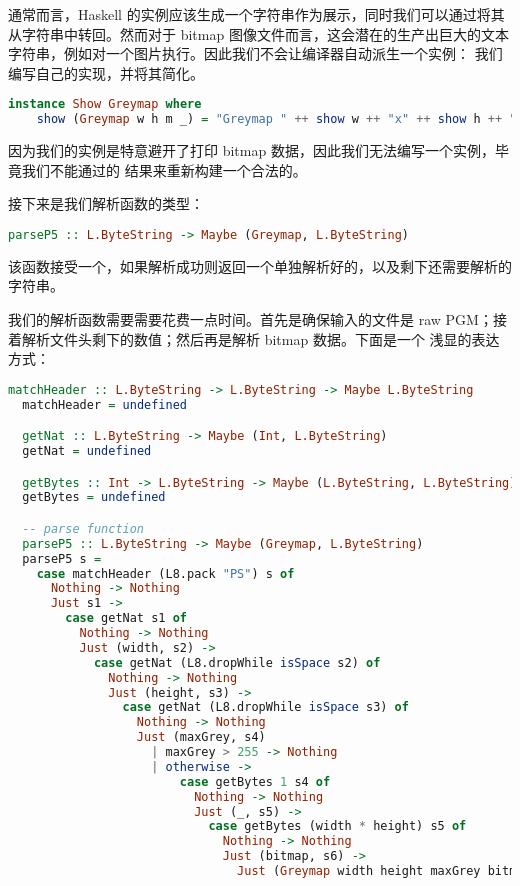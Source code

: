 \documentclass[./main.tex]{subfiles}
\begin{document}
通常而言，Haskell 的实例应该生成一个字符串作为展示，同时我们可以通过将其从字符串中转回。然而对于 bitmap
图像文件而言，这会潜在的生产出巨大的文本字符串，例如对一个图片执行。因此我们不会让编译器自动派生一个实例：
我们编写自己的实现，并将其简化。

\begin{lstlisting}[language=Haskell]
  instance Show Greymap where
    show (Greymap w h m _) = "Greymap " ++ show w ++ "x" ++ show h ++ " " ++ show m
\end{lstlisting}

因为我们的实例是特意避开了打印 bitmap 数据，因此我们无法编写一个实例，毕竟我们不能通过的
结果来重新构建一个合法的。

接下来是我们解析函数的类型：

\begin{lstlisting}[language=Haskell]
  parseP5 :: L.ByteString -> Maybe (Greymap, L.ByteString)
\end{lstlisting}

该函数接受一个，如果解析成功则返回一个单独解析好的，以及剩下还需要解析的字符串。

我们的解析函数需要需要花费一点时间。首先是确保输入的文件是 raw PGM；接着解析文件头剩下的数值；然后再是解析 bitmap 数据。下面是一个
浅显的表达方式：

\begin{lstlisting}[language=Haskell]
  matchHeader :: L.ByteString -> L.ByteString -> Maybe L.ByteString
  matchHeader = undefined

  getNat :: L.ByteString -> Maybe (Int, L.ByteString)
  getNat = undefined

  getBytes :: Int -> L.ByteString -> Maybe (L.ByteString, L.ByteString)
  getBytes = undefined

  -- parse function
  parseP5 :: L.ByteString -> Maybe (Greymap, L.ByteString)
  parseP5 s =
    case matchHeader (L8.pack "PS") s of
      Nothing -> Nothing
      Just s1 ->
        case getNat s1 of
          Nothing -> Nothing
          Just (width, s2) ->
            case getNat (L8.dropWhile isSpace s2) of
              Nothing -> Nothing
              Just (height, s3) ->
                case getNat (L8.dropWhile isSpace s3) of
                  Nothing -> Nothing
                  Just (maxGrey, s4)
                    | maxGrey > 255 -> Nothing
                    | otherwise ->
                        case getBytes 1 s4 of
                          Nothing -> Nothing
                          Just (_, s5) ->
                            case getBytes (width * height) s5 of
                              Nothing -> Nothing
                              Just (bitmap, s6) ->
                                Just (Greymap width height maxGrey bitmap, s6)
\end{lstlisting}
\end{document}

